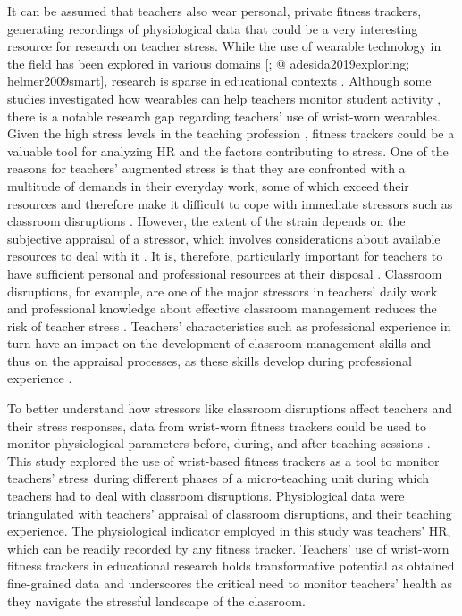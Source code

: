 \documentclass[]{elsarticle} %
\begin{document}
It can be assumed that teachers also wear personal, private fitness
trackers, generating recordings of physiological data that could be a
very interesting resource for research on teacher stress. While the use
of wearable technology in the field has been explored in various domains
{[}\citet{hughes2023wearable}; @ adesida2019exploring;
helmer2009smart{]}, research is sparse in educational contexts
\citep{de2017towards}. Although some studies investigated how wearables
can help teachers monitor student activity \citep{quintana2016keeping},
there is a notable research gap regarding teachers' use of wrist-worn
wearables. Given the high stress levels in the teaching profession
\citep{johnson2005experience}, fitness trackers could be a valuable tool
for analyzing HR and the factors contributing to stress. One of the
reasons for teachers' augmented stress is that they are confronted with
a multitude of demands in their everyday work, some of which exceed
their resources and therefore make it difficult to cope with immediate
stressors such as classroom disruptions \citep{montgomery2005meta}.
However, the extent of the strain depends on the subjective appraisal of
a stressor, which involves considerations about available resources to
deal with it \citep{kyriacou2001}. It is, therefore, particularly
important for teachers to have sufficient personal and professional
resources at their disposal \citep{cramer2018belastung}. Classroom
disruptions, for example, are one of the major stressors in teachers'
daily work \citep{boyle1995structural, aloe2014multivariate} and
professional knowledge about effective classroom management reduces the
risk of teacher stress \citep{klusmann2012berufliche}. Teachers'
characteristics such as professional experience in turn have an impact
on the development of classroom management skills and thus on the
appraisal processes, as these skills develop during professional
experience \citep{ophardt2017klassenmanagement, wolff2015keeping}.

To better understand how stressors like classroom disruptions affect
teachers and their stress responses, data from wrist-worn fitness
trackers could be used to monitor physiological parameters before,
during, and after teaching sessions \citep{wettstein2021}. This study
explored the use of wrist-based fitness trackers as a tool to monitor
teachers' stress during different phases of a micro-teaching unit during
which teachers had to deal with classroom disruptions. Physiological
data were triangulated with teachers' appraisal of classroom
disruptions, and their teaching experience. The physiological indicator
employed in this study was teachers' HR, which can be readily recorded
by any fitness tracker. Teachers' use of wrist-worn fitness trackers in
educational research holds transformative potential as obtained
fine-grained data and underscores the critical need to monitor teachers'
health as they navigate the stressful landscape of the classroom.
\end{document}

